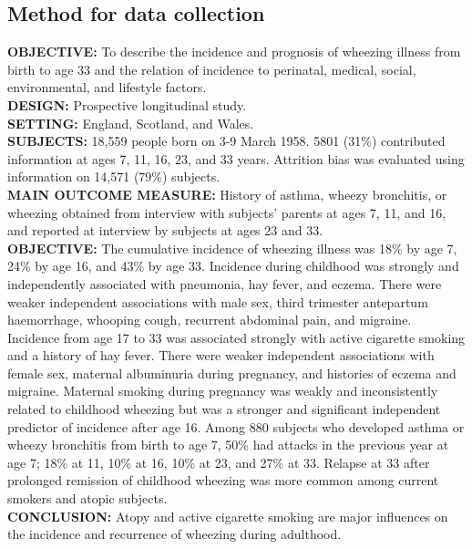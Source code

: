 \documentclass{article}
\begin{document}
	\subsection{Method for data collection}
	
\begin{center}
\underline{}
\end{center}

\begin{flushleft}
\textbf{\small{OBJECTIVE:}} To describe the incidence and prognosis of wheezing illness from birth to age 33 and the relation of incidence to perinatal, medical, social, environmental, and lifestyle factors.\\
\vspace{1 pc}
\textbf{\small{DESIGN:}} Prospective longitudinal study.\\
\vspace{1 pc}
\textbf{\small{SETTING:}} England, Scotland, and Wales.\\
\vspace{1 pc}
\textbf{\small{SUBJECTS:}} 18,559 people born on 3-9 March 1958. 5801 (31\%) contributed information at ages 7, 11, 16, 23, and 33 years. Attrition bias was evaluated using information on 14,571 (79\%) subjects.\\
\vspace{1 pc}
\textbf{\small{MAIN OUTCOME MEASURE:}} History of asthma, wheezy bronchitis, or wheezing obtained from interview with subjects' parents at ages 7, 11, and 16, and reported at interview by subjects at ages 23 and 33.\\
\vspace{1 pc}
\textbf{\small{OBJECTIVE:}} The cumulative incidence of wheezing illness was 18\% by age 7, 24\% by age 16, and 43\% by age 33. Incidence during childhood was strongly and independently associated with pneumonia, hay fever, and eczema. There were weaker independent associations with male sex, third trimester antepartum haemorrhage, whooping cough, recurrent abdominal pain, and migraine. Incidence from age 17 to 33 was associated strongly with active cigarette smoking and a history of hay fever. There were weaker independent associations with female sex, maternal albuminuria during pregnancy, and histories of eczema and migraine. Maternal smoking during pregnancy was weakly and inconsistently related to childhood wheezing but was a stronger and significant independent predictor of incidence after age 16. Among 880 subjects who developed asthma or wheezy bronchitis from birth to age 7, 50\% had attacks in the previous year at age 7; 18\% at 11, 10\% at 16, 10\% at 23, and 27\% at 33. Relapse at 33 after prolonged remission of childhood wheezing was more common among current smokers and atopic subjects.\\
\vspace{1 pc}
\textbf{\small{CONCLUSION:}} Atopy and active cigarette smoking are major influences on the incidence and recurrence of wheezing during adulthood.
\end{flushleft}
\end{document}
